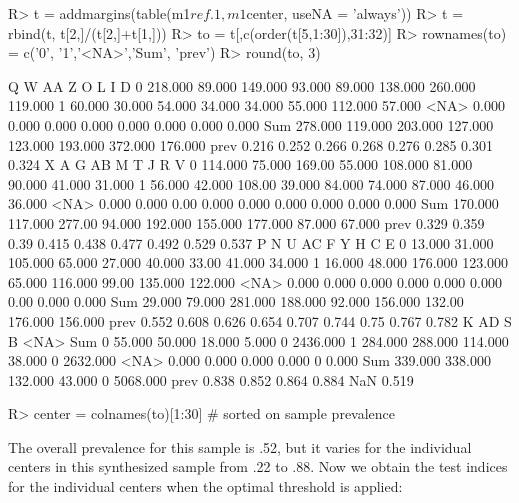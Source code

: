 \documentclass[
  nojss]{jss}
\begin{document}
\begin{CodeChunk}

\begin{CodeInput}
R> t = addmargins(table(m1$ref.1, m1$center, useNA = 'always')) 
R> t = rbind(t, t[2,]/(t[2,]+t[1,]))
R> to = t[,c(order(t[5,1:30]),31:32)]
R> rownames(to) = c('0', '1','<NA>','Sum', 'prev')
R> round(to, 3)
\end{CodeInput}

\begin{CodeOutput}
           Q       W      AA       Z       O       L       I       D
0    218.000  89.000 149.000  93.000  89.000 138.000 260.000 119.000
1     60.000  30.000  54.000  34.000  34.000  55.000 112.000  57.000
<NA>   0.000   0.000   0.000   0.000   0.000   0.000   0.000   0.000
Sum  278.000 119.000 203.000 127.000 123.000 193.000 372.000 176.000
prev   0.216   0.252   0.266   0.268   0.276   0.285   0.301   0.324
           X       A      G     AB       M       T       J      R      V
0    114.000  75.000 169.00 55.000 108.000  81.000  90.000 41.000 31.000
1     56.000  42.000 108.00 39.000  84.000  74.000  87.000 46.000 36.000
<NA>   0.000   0.000   0.00  0.000   0.000   0.000   0.000  0.000  0.000
Sum  170.000 117.000 277.00 94.000 192.000 155.000 177.000 87.000 67.000
prev   0.329   0.359   0.39  0.415   0.438   0.477   0.492  0.529  0.537
          P      N       U      AC      F       Y      H       C       E
0    13.000 31.000 105.000  65.000 27.000  40.000  33.00  41.000  34.000
1    16.000 48.000 176.000 123.000 65.000 116.000  99.00 135.000 122.000
<NA>  0.000  0.000   0.000   0.000  0.000   0.000   0.00   0.000   0.000
Sum  29.000 79.000 281.000 188.000 92.000 156.000 132.00 176.000 156.000
prev  0.552  0.608   0.626   0.654  0.707   0.744   0.75   0.767   0.782
           K      AD       S      B <NA>      Sum
0     55.000  50.000  18.000  5.000    0 2436.000
1    284.000 288.000 114.000 38.000    0 2632.000
<NA>   0.000   0.000   0.000  0.000    0    0.000
Sum  339.000 338.000 132.000 43.000    0 5068.000
prev   0.838   0.852   0.864  0.884  NaN    0.519
\end{CodeOutput}

\begin{CodeInput}
R> center = colnames(to)[1:30] # sorted on sample prevalence
\end{CodeInput}
\end{CodeChunk}

The overall prevalence for this sample is .52, but it varies for the
individual centers in this synthesized sample from .22 to .88. Now we
obtain the test indices for the individual centers when the optimal
threshold is applied:
\end{document}

